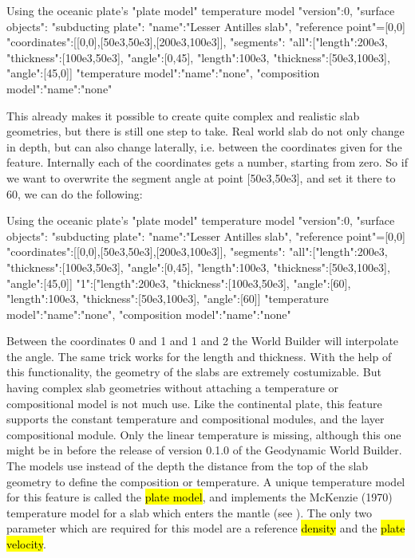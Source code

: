 \documentclass{book}
\newcommand{\GWB}{{Geodynamic World Builder}}
\newcommand{\WB}{{World Builder}}
\begin{document}
\begin{bashcode}{Using the oceanic plate's "plate model" temperature model}
"version":0,
"surface objects":
{
  "subducting plate":
  {
    "name":"Lesser Antilles slab", "reference point"=[0,0]
    "coordinates":[[0,0],[50e3,50e3],[200e3,100e3]],
    "segments":
    {
      "all":[{"length":200e3, "thickness":[100e3,50e3], "angle":[0,45]},
              {"length":100e3, "thickness":[50e3,100e3], "angle":[45,0]}]
    }
    "temperature model":{"name":"none"},
    "composition model":{"name":"none"}
  }
}
\end{bashcode}

This already makes it possible to create quite complex and realistic slab geometries, but there is still one step to take. Real world slab do not only change in depth, but can also change laterally, i.e. between the coordinates given for the feature. Internally each of the coordinates gets a number, starting from zero. So if we want to overwrite the segment angle at point [50e3,50e3], and set it there to 60, we can do the following:

\begin{bashcode}{Using the oceanic plate's "plate model" temperature model}
"version":0,
"surface objects":
{
  "subducting plate":
  {
    "name":"Lesser Antilles slab", "reference point"=[0,0]
    "coordinates":[[0,0],[50e3,50e3],[200e3,100e3]],
    "segments":
    {
      "all":[{"length":200e3, "thickness":[100e3,50e3], "angle":[0,45]},
              {"length":100e3, "thickness":[50e3,100e3], "angle":[45,0]}]
      "1":[{"length":200e3, "thickness":[100e3,50e3], "angle":[60]},
             {"length":100e3, "thickness":[50e3,100e3], "angle":[60]}]
    }
    "temperature model":{"name":"none"},
    "composition model":{"name":"none"}
  }
}
\end{bashcode}

Between the coordinates 0 and 1 and 1 and 2 the \WB{} will interpolate the angle. The same trick works for the length and thickness. With the help of this functionality, the  geometry of the slabs are extremely costumizable. But having complex slab geometries without attaching a temperature or compositional model is not much use. Like the continental plate, this feature supports the constant temperature and compositional modules, and the layer compositional module. Only the linear temperature is missing, although this one might be in before the release of version 0.1.0 of the \GWB{}. The models use instead of the depth the distance from the top of the slab geometry to define the composition or temperature. A unique temperature model for this feature is called the \hl{plate model}, and implements the McKenzie (1970) temperature model for a slab which enters the mantle (see \cite{mckenzie1970}). The only two parameter which are required for this model are a reference \hl{density} and the \hl{plate velocity}.
\end{document}
